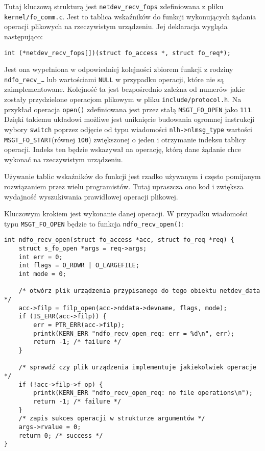 \documentclass[10pt]{scrartcl}
\begin{document}
Tutaj kluczową strukturą jest \texttt{netdev\_recv\_fops} zdefiniowana z pliku \texttt{kernel/fo\_comm.c}. Jest to tablica wskaźników do funkcji wykonujących żądania operacji plikowych na rzeczywistym urządzeniu. Jej deklaracja wygląda następująco:

\begin{verbatim}
int (*netdev_recv_fops[])(struct fo_access *, struct fo_req*);
\end{verbatim}

Jest ona wypełniona w odpowiedniej kolejności zbiorem funkcji z rodziny \texttt{ndfo\_recv\_\ldots} lub wartościami \texttt{NULL} w przypadku operacji, które nie są zaimplementowane. Kolejność ta jest bezpośrednio zależna od numerów jakie zostały przydzielone operacjom plikowym w pliku \texttt{include/protocol.h}. Na przykład operacja \texttt{open()} zdefiniowana jest przez stałą \texttt{MSGT\_FO\_OPEN} jako \texttt{111}.  Dzięki takiemu układowi możliwe jest uniknięcie budowania ogromnej instrukcji wybory \texttt{switch} poprzez odjęcie od typu wiadomości \texttt{nlh-\textgreater{}nlmsg\_type} wartości \texttt{MSGT\_FO\_START}(równej \texttt{100}) zwiększonej o jeden i otrzymanie indeksu tablicy operacji. Indeks ten będzie wskazywał na operację, którą dane żądanie chce wykonać na rzeczywistym urządzeniu.

Używanie tablic wskaźników do funkcji jest rzadko używanym i często pomijanym rozwiązaniem przez wielu programistów. Tutaj upraszcza ono kod i zwiększa wydajność wyszukiwania prawidłowej operacji plikowej.

Kluczowym krokiem jest wykonanie danej operacji. W przypadku wiadomości typu \texttt{MSGT\_FO\_OPEN} będzie to funkcja \texttt{ndfo\_recv\_open()}:

\newpage
\begin{verbatim}
int ndfo_recv_open(struct fo_access *acc, struct fo_req *req) {
    struct s_fo_open *args = req->args;
    int err = 0;
    int flags = O_RDWR | O_LARGEFILE;
    int mode = 0;

    /* otwórz plik urządzenia przypisanego do tego obiektu netdev_data */
    acc->filp = filp_open(acc->nddata->devname, flags, mode);
    if (IS_ERR(acc->filp)) {
        err = PTR_ERR(acc->filp);
        printk(KERN_ERR "ndfo_recv_open_req: err = %d\n", err);
        return -1; /* failure */
    }

    /* sprawdź czy plik urządzenia implementuje jakiekolwiek operacje */
    if (!acc->filp->f_op) {
        printk(KERN_ERR "ndfo_recv_open_req: no file operations\n");
        return -1; /* failure */
    }
    /* zapis sukces operacji w strukturze argumentów */
    args->rvalue = 0;
    return 0; /* success */
}
\end{verbatim}
\end{document}

